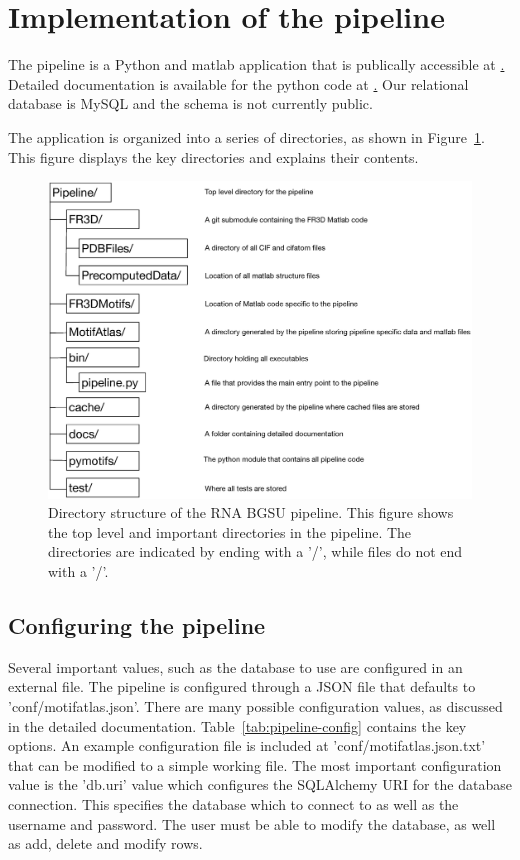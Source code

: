 \section{Implementation of the pipeline}

The pipeline is a Python and matlab application that is publically accessible at
\href{https://github.com/BGSU-RNA/RNA-3D-Hub-core}. Detailed documentation is
available for the python code at \href{http://rna-3d-hub-core.readthedocs.io/}.
Our relational database is MySQL and the schema is not currently public.

The application is organized into a series of directories, as shown in
Figure~\ref{fig:pipeline-organization}. This figure displays the key directories
and explains their contents.

\begin{figure}
\includegraphics{chapter-2/figs/directories}
\caption{Directory structure of the RNA BGSU pipeline. This figure shows the top
level and important directories in the pipeline. The directories are indicated
by ending with a '/', while files do not end with a '/'.}
\label{fig:pipeline-organization}
\end{figure}

\subsection{Configuring the pipeline}

Several important values, such as the database to use are configured in an
external file. The pipeline is configured through a JSON file that defaults to
'conf/motifatlas.json'. There are many possible configuration values, as
discussed in the detailed documentation. Table~\ref{tab:pipeline-config}
contains the key options. An example configuration file is included at
'conf/motifatlas.json.txt' that can be modified to a simple working file. The
most important configuration value is the 'db.uri' value which configures the
SQLAlchemy URI for the database connection. This specifies the database which to
connect to as well as the username and password. The user must be able to modify
the database, as well as add, delete and modify rows.

